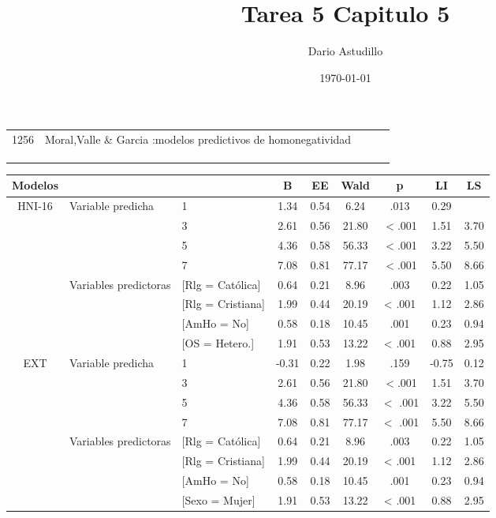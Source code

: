 \documentclass[a4paper, 11pt]{article}
\author{Dario Astudillo }
\title{Tarea 5 Capitulo 5}
\date{\today}
\begin{document}
\maketitle
\begin{table}[h]
\label{my-label}
\begin{tabular}{lllll}
\multicolumn{1}{c|}{\multirow{2}{*}{1256}} & Moral,Valle \& Garcia :modelos predictivos de homonegatividad &  &  &  \\
\multicolumn{1}{c|}{}                      &                                                               &  &  &  \\
                                           &                                                               &  &  &  \\
                                           &                                                               &  &  & 
\end{tabular}
\begin{tabular}{c p{} lcccccc} \hline
Modelos & & & B & EE & Wald & p & LI & LS\\ \hline
\multirow{8}{*}{HNI-16} & \multirow{4}{2cm}{Variable predicha}& 1 & 1.34 & 0.54 & 6.24 & .013 & 0.29 \\
& & 3 & 2.61 & 0.56 & 21.80 & \(<\).001 & 1.51 & 3.70 \\
&& 5 & 4.36 & 0.58 & 56.33 & \(<\).001 & 3.22 & 5.50 \\
&& 7 & 7.08 & 0.81 & 77.17 & \(<\).001 & 5.50 & 8.66 \\
& \multirow{4}{2cm}{Variables predictoras} & [Rlg = Católica] & 0.64 & 0.21 & 8.96 & .003 & 0.22 & 1.05 \\
&& [Rlg = Cristiana] & 1.99 & 0.44 & 20.19 & < .001 & 1.12 & 2.86 \\
&& [AmHo = No] & 0.58 & 0.18 & 10.45 & .001 & 0.23 & 0.94 \\
&& [OS = Hetero.] & 1.91 & 0.53 & 13.22 & < .001 & 0.88 & 2.95 \\


\multirow{8}{*}{EXT} & \multirow{4}{2cm}{Variable predicha}& 1 & -0.31 & 0.22 & 1.98 & .159 & -0.75 &0.12 \\
& & 3 & 2.61 & 0.56 & 21.80 & \(<\).001 & 1.51 & 3.70 \\
&& 5 & 4.36 & 0.58 & 56.33 & \(<\) .001 & 3.22 & 5.50 \\
&& 7 & 7.08 & 0.81 & 77.17 & \(<\) .001 & 5.50 & 8.66 \\
& \multirow{4}{2cm}{Variables predictoras} & [Rlg = Católica] & 0.64 & 0.21 & 8.96 & .003 & 0.22 & 1.05 \\
&& [Rlg = Cristiana] & 1.99 & 0.44 & 20.19 & < .001 & 1.12 & 2.86 \\
&& [AmHo = No] & 0.58 & 0.18 & 10.45 & .001 & 0.23 & 0.94 \\
&& [Sexo = Mujer] & 1.91 & 0.53 & 13.22 & < .001 & 0.88 & 2.95 \\



\end{tabular}
\end{table}
\end{document}
